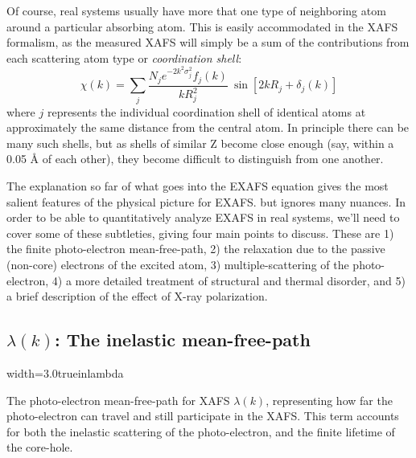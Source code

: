 Of course, real systems usually have more that one type of neighboring atom
around a particular absorbing atom.  This is easily accommodated in the
XAFS formalism, as the measured XAFS will simply be a sum of the
contributions from each scattering atom type or \emph{coordination shell}:
\begin{equation}
  \chi(k) = \sum_j {
    {{ \frac{N_j e^{-2k^2\sigma_j^2} f_j(k)}{kR_j^2}}}\>
      \sin[2kR_j + \delta_j(k)] }
      \label{Eq:xafs3}
\end{equation}
\noindent
where $j$ represents the individual coordination shell of identical atoms
at approximately the same distance from the central atom.  In principle
there can be many such shells, but as shells of similar Z become close
enough (say, within a 0.05 {\AA} of each other), they become difficult to
distinguish from one another.

The explanation so far of what goes into the EXAFS equation gives the most
salient features of the physical picture for EXAFS.  but ignores many
nuances.  In order to be able to quantitatively analyze EXAFS in real
systems, we'll need to cover some of these subtleties, giving four main
points to discuss.  These are 1) the finite photo-electron mean-free-path,
2) the relaxation due to the passive (non-core) electrons of the excited
atom, 3) multiple-scattering of the photo-electron,  4) a more detailed
treatment of structural and thermal disorder, and 5) a brief description of
the effect of X-ray polarization.

\subsection{$\lambda(k)$: The inelastic mean-free-path}

\begin{Nfig}{width=3.0truein}{lambda}
  \caption{The photo-electron mean-free-path for XAFS $\lambda(k)$,
    representing how far the photo-electron can travel and still participate
    in the XAFS.  This term accounts for both the inelastic scattering of the
    photo-electron, and the finite lifetime of the core-hole.}
  \label{Fig:THE:lambda}
\end{Nfig}

